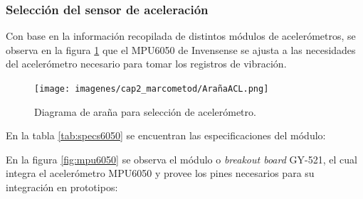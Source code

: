 \subsubsection{Selección del sensor de aceleración}

Con base en la información recopilada de distintos módulos de acelerómetros, se observa en la figura \ref{fig:arañaacl} que el MPU6050 de Invensense se ajusta a las necesidades del acelerómetro necesario para tomar los registros de vibración.

\begin{figure}[H]
    \centering
    \texttt{[image: imagenes/cap2\_marcometod/ArañaACL.png]}
    \caption{Diagrama de araña para selección de acelerómetro.}
    \label{fig:arañaacl}
\end{figure}

En la tabla \ref{tab:specs6050} se encuentran las especificaciones del módulo:

\begin{table}[H]
    \centering
    \caption{Especificaciones del MPU6050 de Invensense.}
    \label{tab:specs6050}
    \end{table}

En la figura \ref{fig:mpu6050} se observa el módulo o \textit{breakout board} GY-521, el cual integra el acelerómetro MPU6050 y provee los pines necesarios para su integración en prototipos:

